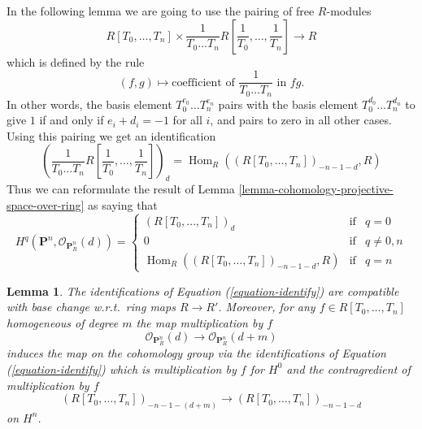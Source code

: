 \documentclass{stacks-project}
\theoremstyle{plain}
\newtheorem{lemma}[subsection]{Lemma}
\theoremstyle{definition}
\theoremstyle{remark}
\numberwithin{equation}{subsection}
\def\Hom{\mathop{\mathrm{Hom}}\nolimits}
\begin{document}
\noindent
In the following lemma we are going to use the pairing of free
$R$-modules
$$
R[T_0, \ldots, T_n]
\times
\frac{1}{T_0 \ldots T_n} R[\frac{1}{T_0}, \ldots, \frac{1}{T_n}]
\longrightarrow
R
$$
which is defined by the rule
$$
(f, g)
\longmapsto
\text{coefficient of }
\frac{1}{T_0 \ldots T_n}
\text{ in }fg.
$$
In other words, the basis element $T_0^{e_0} \ldots T_n^{e_n}$ pairs
with the basis element $T_0^{d_0} \ldots T_n^{d_n}$ to give $1$ if and only
if $e_i + d_i = -1$ for all $i$, and pairs to zero in all other cases.
Using this pairing we get an identification
$$
\left(\frac{1}{T_0 \ldots T_n} R[\frac{1}{T_0}, \ldots, \frac{1}{T_n}]\right)_d
=
\Hom_R((R[T_0, \ldots, T_n])_{-n - 1 - d}, R)
$$
Thus we can reformulate the result of
Lemma \ref{lemma-cohomology-projective-space-over-ring} as saying that
\begin{equation}
\label{equation-identify}
H^q(\mathbf{P}^n, \mathcal{O}_{\mathbf{P}^n_R}(d)) =
\left\{
\begin{matrix}
(R[T_0, \ldots, T_n])_d & \text{if} & q = 0 \\
0 & \text{if} & q \not = 0, n \\
\Hom_R((R[T_0, \ldots, T_n])_{-n - 1 - d}, R)
& \text{if} & q = n
\end{matrix}
\right.
\end{equation}

\begin{lemma}
\label{lemma-identify-functorially}
The identifications of Equation (\ref{equation-identify}) are
compatible with base change w.r.t.\ ring maps $R \to R'$.
Moreover, for any $f \in R[T_0, \ldots, T_n]$ homogeneous
of degree $m$ the map multiplication by $f$
$$
\mathcal{O}_{\mathbf{P}^n_R}(d)
\longrightarrow
\mathcal{O}_{\mathbf{P}^n_R}(d + m)
$$
induces the map on the cohomology group via the identifications
of Equation (\ref{equation-identify}) which is multiplication by
$f$ for $H^0$ and the contragredient of multiplication by $f$
$$
(R[T_0, \ldots, T_n])_{-n - 1 - (d + m)}
\longrightarrow
(R[T_0, \ldots, T_n])_{-n - 1 - d}
$$
on $H^n$.
\end{lemma}
\end{document}
